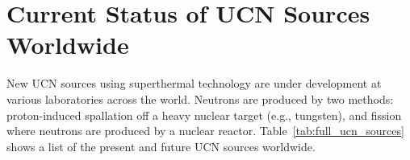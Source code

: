 











\section{Current Status of UCN Sources Worldwide}
New UCN sources using superthermal technology are under development at
various laboratories across the world. Neutrons are produced by two
methods: proton-induced spallation off a heavy nuclear target (e.g.,
tungsten), and fission where neutrons are produced by a nuclear
reactor. Table~\ref{tab:full_ucn_sources}%
shows a list of the present and future UCN sources worldwide.



